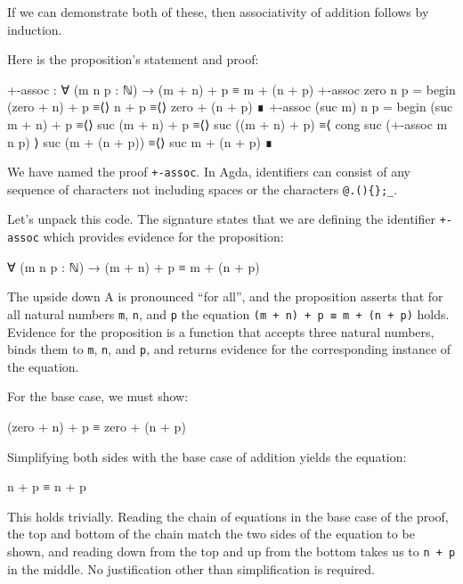 If we can demonstrate both of these, then associativity of addition
follows by induction.

Here is the proposition's statement and proof:

\begin{fence}
\begin{code}
+-assoc : ∀ (m n p : ℕ) → (m + n) + p ≡ m + (n + p)
+-assoc zero n p =
  begin
    (zero + n) + p
  ≡⟨⟩
    n + p
  ≡⟨⟩
    zero + (n + p)
  ∎
+-assoc (suc m) n p =
  begin
    (suc m + n) + p
  ≡⟨⟩
    suc (m + n) + p
  ≡⟨⟩
    suc ((m + n) + p)
  ≡⟨ cong suc (+-assoc m n p) ⟩
    suc (m + (n + p))
  ≡⟨⟩
    suc m + (n + p)
  ∎
\end{code}
\end{fence}

We have named the proof \texttt{+-assoc}. In Agda, identifiers can
consist of any sequence of characters not including spaces or the
characters \texttt{@.()\{\};\_}.

Let's unpack this code. The signature states that we are defining the
identifier \texttt{+-assoc} which provides evidence for the proposition:

\begin{myDisplay}
∀ (m n p : ℕ) → (m + n) + p ≡ m + (n + p)
\end{myDisplay}

The upside down A is pronounced ``for all'', and the proposition asserts
that for all natural numbers \texttt{m}, \texttt{n}, and \texttt{p} the
equation \texttt{(m\ +\ n)\ +\ p\ ≡\ m\ +\ (n\ +\ p)} holds. Evidence
for the proposition is a function that accepts three natural numbers,
binds them to \texttt{m}, \texttt{n}, and \texttt{p}, and returns
evidence for the corresponding instance of the equation.

For the base case, we must show:

\begin{myDisplay}
(zero + n) + p ≡ zero + (n + p)
\end{myDisplay}

Simplifying both sides with the base case of addition yields the
equation:

\begin{myDisplay}
n + p ≡ n + p
\end{myDisplay}

This holds trivially. Reading the chain of equations in the base case of
the proof, the top and bottom of the chain match the two sides of the
equation to be shown, and reading down from the top and up from the
bottom takes us to \texttt{n\ +\ p} in the middle. No justification
other than simplification is required.

